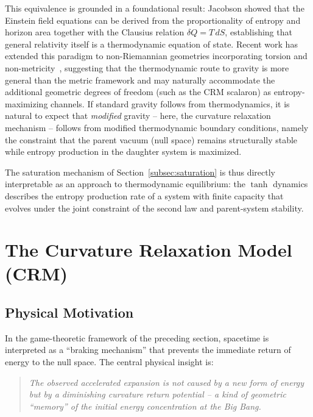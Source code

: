 \documentclass[aps,prd,twocolumn,superscriptaddress,nofootinbib]{revtex4-2}
\begin{document}
This equivalence is grounded in a foundational result: Jacobson \cite{Jacobson1995} showed that the Einstein field equations can be derived from the proportionality of entropy and horizon area together with the Clausius relation $\delta Q = T\,dS$, establishing that general relativity itself is a thermodynamic equation of state. Recent work has extended this paradigm to non-Riemannian geometries incorporating torsion and non-metricity~\cite{JacobsonNonRiemannian2026}, suggesting that the thermodynamic route to gravity is more general than the metric framework and may naturally accommodate the additional geometric degrees of freedom (such as the CRM scalaron) as entropy-maximizing channels. If standard gravity follows from thermodynamics, it is natural to expect that \textit{modified} gravity -- here, the curvature relaxation mechanism -- follows from modified thermodynamic boundary conditions, namely the constraint that the parent vacuum (null space) remains structurally stable while entropy production in the daughter system is maximized.

The saturation mechanism of Section~\ref{subsec:saturation} is thus directly interpretable as an approach to thermodynamic equilibrium: the $\tanh$ dynamics describes the entropy production rate of a system with finite capacity that evolves under the joint constraint of the second law and parent-system stability.


\section{The Curvature Relaxation Model (CRM)}
\label{sec:crm}

\subsection{Physical Motivation}
\label{subsec:motivation}

In the game-theoretic framework of the preceding section, spacetime is interpreted as a ``braking mechanism'' that prevents the immediate return of energy to the null space. The central physical insight is:

\begin{quote}
\textit{The observed accelerated expansion is not caused by a new form of energy but by a diminishing curvature return potential -- a kind of geometric ``memory'' of the initial energy concentration at the Big Bang.}
\end{quote}
\end{document}
